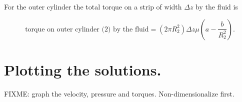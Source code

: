 For the outer cylinder the total torque on a strip of width $\Delta z$ by the fluid is

\begin{equation}\label{eqn:couetteFlow:1290}
\text{torque on outer cylinder (2) by the fluid} = (2 \pi R_2^2) \Delta z \mu \left( a - \frac{b}{R_2^2} \right).
\end{equation}

\section{Plotting the solutions.}

FIXME: graph the velocity, pressure and torques.  Non-dimensionalize first.

\EndArticle
